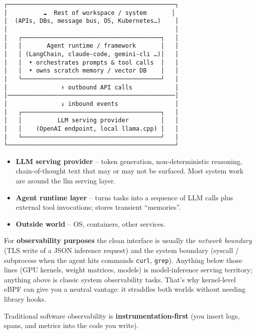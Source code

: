 \documentclass[sigplan,screen，review,9pt]{acmart}
\begin{document}
\begin{center}
    
\begin{Verbatim}[fontsize=\small, commandchars=\\\{\}]
┌───────────────────────────────────────────────┐
│          ☁  Rest of workspace / system       │
│  (APIs, DBs, message bus, OS, Kubernetes…)    │
│                                               │
│   ┌───────────────────────────────────────┐   │
│   │       Agent runtime / framework       │   │
│   │ (LangChain, claude-code, gemini-cli …)│   │
│   │  • orchestrates prompts & tool calls  │   │
│   │  • owns scratch memory / vector DB    │   │
│   └───────────────────────────────────────┘   │
│               ↑ outbound API calls            │
│───────────────────────────────────────────────│
│               ↓ inbound events                │
│   ┌───────────────────────────────────────┐   │
│   │          LLM serving provider         │   │
│   │    (OpenAI endpoint, local llama.cpp) │   │
│   └───────────────────────────────────────┘   │
└───────────────────────────────────────────────┘
\end{Verbatim}
\end{center}


\begin{itemize}
  \item \textbf{LLM serving provider} – token generation, non-deterministic reasoning, chain-of-thought text that may or may not be surfaced. Most system work are around the llm serving layer.
  \item \textbf{Agent runtime layer} – turns tasks into a sequence of LLM calls plus external tool invocations; stores transient ``memories''.
  \item \textbf{Outside world} – OS, containers, other services.
\end{itemize}

For \textbf{observability purposes} the clean interface is usually the \emph{network boundary} (TLS write of a JSON inference request) and the system boundary (syscall / subprocess when the agent hits commands \verb|curl|, \verb|grep|).  Anything below those lines (GPU kernels, weight matrices, models) is model-inference serving territory; anything above is classic system observability tasks.  That’s why kernel-level eBPF can give you a neutral vantage: it straddles both worlds without needing library hooks.

Traditional software observability is \textbf{instrumentation-first} (you insert logs, spans, and metrics into the code you write).
\end{document}
